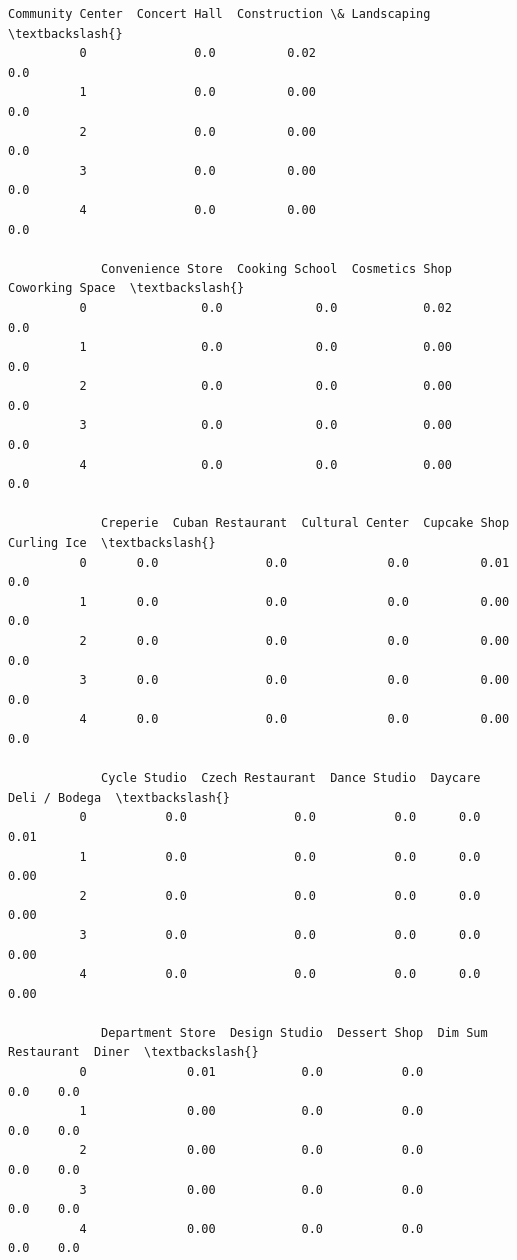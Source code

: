 \documentclass[11pt]{article}
\begin{document}
\begin{Verbatim}[commandchars=\\\{\}]
             Community Center  Concert Hall  Construction \& Landscaping  \textbackslash{}
          0               0.0          0.02                         0.0   
          1               0.0          0.00                         0.0   
          2               0.0          0.00                         0.0   
          3               0.0          0.00                         0.0   
          4               0.0          0.00                         0.0   
          
             Convenience Store  Cooking School  Cosmetics Shop  Coworking Space  \textbackslash{}
          0                0.0             0.0            0.02              0.0   
          1                0.0             0.0            0.00              0.0   
          2                0.0             0.0            0.00              0.0   
          3                0.0             0.0            0.00              0.0   
          4                0.0             0.0            0.00              0.0   
          
             Creperie  Cuban Restaurant  Cultural Center  Cupcake Shop  Curling Ice  \textbackslash{}
          0       0.0               0.0              0.0          0.01          0.0   
          1       0.0               0.0              0.0          0.00          0.0   
          2       0.0               0.0              0.0          0.00          0.0   
          3       0.0               0.0              0.0          0.00          0.0   
          4       0.0               0.0              0.0          0.00          0.0   
          
             Cycle Studio  Czech Restaurant  Dance Studio  Daycare  Deli / Bodega  \textbackslash{}
          0           0.0               0.0           0.0      0.0           0.01   
          1           0.0               0.0           0.0      0.0           0.00   
          2           0.0               0.0           0.0      0.0           0.00   
          3           0.0               0.0           0.0      0.0           0.00   
          4           0.0               0.0           0.0      0.0           0.00   
          
             Department Store  Design Studio  Dessert Shop  Dim Sum Restaurant  Diner  \textbackslash{}
          0              0.01            0.0           0.0                 0.0    0.0   
          1              0.00            0.0           0.0                 0.0    0.0   
          2              0.00            0.0           0.0                 0.0    0.0   
          3              0.00            0.0           0.0                 0.0    0.0   
          4              0.00            0.0           0.0                 0.0    0.0   
          

\end{Verbatim}
\end{document}
